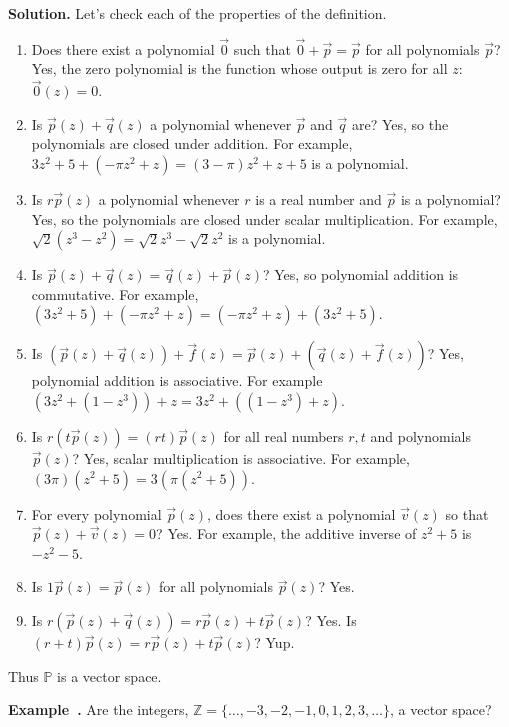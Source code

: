 \documentclass[11pt, letterpaper]{report}
\newenvironment{notes}{}{}
\newenvironment{book}{}{}
\newcounter{example}[section]
\newcommand{\example}{\refstepcounter{example}%
\par\noindent\textbf{Example~\theexample.} }
\begin{document}
\begin{notes}
\vfill
\vfill
\end{notes}

\begin{book}
\textbf{Solution.} Let's check each of the properties of the definition.
\begin{enumerate}[label=(\roman*)]
\item Does there exist a polynomial $\vec{0}$ such that $\vec{0}+\vec{p}=\vec{p}$ for all polynomials $\vec{p}$? Yes, the zero polynomial is the function whose output is zero for all $z$: $\vec{0}(z)=0$.
\item Is $\vec{p}(z)+\vec{q}(z)$ a polynomial whenever $\vec{p}$ and $\vec{q}$ are? Yes, so the polynomials are closed under addition. For example, $3z^2+5 + (-\pi z^2+z) = (3-\pi)z^2+z+5$ is a polynomial.
\item Is $r\vec{p}(z)$ a polynomial whenever $r$ is a real number and $\vec{p}$ is a polynomial? Yes, so the polynomials are closed under scalar multiplication. For example, $\sqrt{2}(z^{3}-z^2) = \sqrt{2}z^3-\sqrt{2}z^2$ is a polynomial.
\item Is $\vec{p}(z)+\vec{q}(z) = \vec{q}(z)+\vec{p}(z)$? Yes, so polynomial addition is commutative. For example, $(3z^2+5) + (-\pi z^2+z) = (-\pi z^{2} +z) + (3z^2+5)$.
\item Is $( \vec{p}(z) + \vec{q}(z) ) + \vec{f}(z) = \vec{p}(z) + ( \vec{q}(z) + \vec{f}(z) )$? Yes, polynomial addition is associative. For example $(3z^2+(1-z^3)) + z = 3z^2 + ((1-z^3) + z)$.
\item Is $r(t\vec{p}(z)) =(rt)\vec{p}(z)$ for all real numbers $r,t$ and polynomials $\vec{p}(z)$? Yes, scalar multiplication is associative. For example, $(3\pi)(z^2+5) = 3(\pi(z^2+5))$.
\item For every polynomial $\vec{p}(z)$, does there exist a polynomial $\vec{v}(z)$ so that $\vec{p}(z)+\vec{v}(z) = 0$? Yes. For example, the additive inverse of $z^2+5$ is $-z^2-5$.
\item Is $1\vec{p}(z)=\vec{p}(z)$ for all polynomials $\vec{p}(z)$? Yes.
\item Is $r(\vec{p}(z)+\vec{q}(z)) = r\vec{p}(z) + t\vec{p}(z)$? Yes. Is $(r+t)\vec{p}(z)=r\vec{p}(z)+t\vec{p}(z)$? Yup.
\end{enumerate}
Thus $\mathbb{P}$ is a vector space. \blacksquare
\end{book}

\example {} Are the integers, $\mathbb{Z} = \{\ldots,-3,-2,-1,0,1,2,3,\ldots\}$, a vector space?
\end{document}
